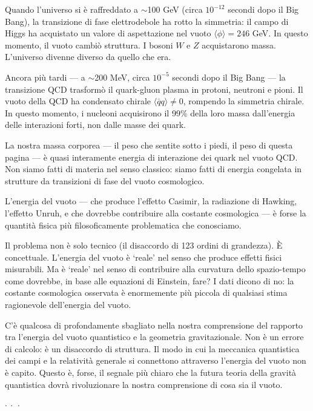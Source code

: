 \documentclass[12pt,a4paper,openany]{book}
\newcommand{\sezione}[1]{\vspace{1.2em}{\large\bfseries #1}\vspace{0.5em}\par}
\newcommand{\puntini}{\begin{center}$\cdot\ \cdot\ \cdot$\end{center}\vspace{0.3em}}
\begin{document}
Quando l'universo si è raffreddato a $\sim$100 GeV (circa $10^{-12}$ secondi dopo il Big Bang), la transizione di fase elettrodebole ha rotto la simmetria: il campo di Higgs ha acquistato un valore di aspettazione nel vuoto $\langle\phi\rangle = 246$ GeV. In questo momento, il vuoto cambiò struttura. I bosoni $W$ e $Z$ acquistarono massa. L'universo divenne diverso da quello che era.

Ancora più tardi --- a $\sim$200 MeV, circa $10^{-5}$ secondi dopo il Big Bang --- la transizione QCD trasformò il quark-gluon plasma in protoni, neutroni e pioni. Il vuoto della QCD ha condensato chirale $\langle\bar{q}q\rangle \neq 0$, rompendo la simmetria chirale. In questo momento, i nucleoni acquisirono il 99\% della loro massa dall'energia delle interazioni forti, non dalle masse dei quark.

La nostra massa corporea --- il peso che sentite sotto i piedi, il peso di questa pagina --- è quasi interamente energia di interazione dei quark nel vuoto QCD. Non siamo fatti di materia nel senso classico: siamo fatti di energia congelata in strutture da transizioni di fase del vuoto cosmologico.

\sezione{L'energia del vuoto come problema filosofico}

L'energia del vuoto --- che produce l'effetto Casimir, la radiazione di Hawking, l'effetto Unruh, e che dovrebbe contribuire alla costante cosmologica --- è forse la quantità fisica più filosoficamente problematica che conosciamo.

Il problema non è solo tecnico (il disaccordo di 123 ordini di grandezza). È concettuale. L'energia del vuoto è `reale' nel senso che produce effetti fisici misurabili. Ma è `reale' nel senso di contribuire alla curvatura dello spazio-tempo come dovrebbe, in base alle equazioni di Einstein, fare? I dati dicono di no: la costante cosmologica osservata è enormemente più piccola di qualsiasi stima ragionevole dell'energia del vuoto.

C'è qualcosa di profondamente sbagliato nella nostra comprensione del rapporto tra l'energia del vuoto quantistico e la geometria gravitazionale. Non è un errore di calcolo: è un disaccordo di struttura. Il modo in cui la meccanica quantistica dei campi e la relatività generale si connettono attraverso l'energia del vuoto non è capito. Questo è, forse, il segnale più chiaro che la futura teoria della gravità quantistica dovrà rivoluzionare la nostra comprensione di cosa sia il vuoto.

\puntini
\end{document}
